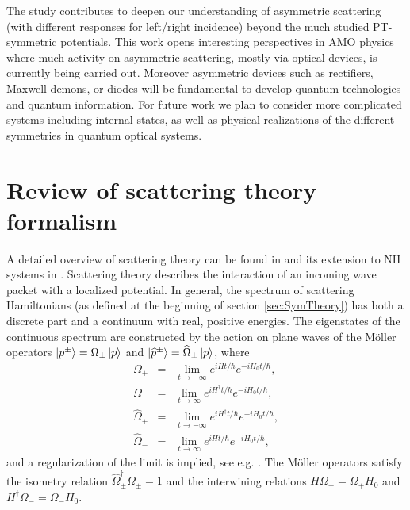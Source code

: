 The study contributes to deepen our  understanding of asymmetric scattering  (with different responses for left/right incidence) beyond the
much studied  PT-symmetric potentials. This work opens interesting perspectives in AMO physics where much activity on asymmetric-scattering, mostly via optical devices,   is currently being carried out. Moreover asymmetric devices such as rectifiers, Maxwell demons, or diodes will be fundamental to  develop quantum technologies and quantum information. For future work we plan to consider more complicated systems including internal states, as well as physical realizations of the different symmetries in quantum optical systems.

\section{Review of scattering theory formalism \label{sec:ScattFormalism}}
%
A detailed overview of scattering theory can be found in \cite{Taylor1972} and its extension to NH systems in \cite{Muga2004}. Scattering theory describes the interaction of an incoming wave packet with a localized potential. In general, the spectrum of scattering Hamiltonians (as defined at the beginning of section \ref{sec:SymTheory}) has both a discrete part and a continuum with real, positive energies.
The eigenstates of the continuous spectrum are constructed by the action on plane waves of the M\"oller operators
$\ket{p^\pm}=\Omega_\pm \ket{p}$ and $\ket{\widehat{p}^\pm}=\widehat{\Omega}_\pm \ket{p}$,
where
%
\begin{eqnarray}
    \Omega_+ &=& \lim_{t \to -\infty}e^{i H t / \hbar}e^{-i H_0 t/ \hbar},\nonumber\\
    \Omega_- &=& \lim_{t \to \infty}e^{i H^\dagger t/ \hbar}e^{-i H_0 t/ \hbar},\nonumber\\
    \widehat{\Omega}_+ &=& \lim_{t \to -\infty}e^{i H^\dagger t/ \hbar}e^{-i H_0 t/ \hbar},\nonumber\\
    \widehat{\Omega}_- &=& \lim_{t \to \infty}e^{i H t/ \hbar}e^{-i H_0 t/ \hbar},
\end{eqnarray}
%
and a regularization of the limit is implied, see e.g. \cite{Muga2004}.
The M\"oller operators satisfy the isometry relation $\widehat{\Omega}_{\pm}^\dagger\Omega_{\pm} = 1$ and the interwining relations $H \Omega_+ = \Omega_+ H_0$ and $H^\dagger \Omega_- = \Omega_- H_0$.
